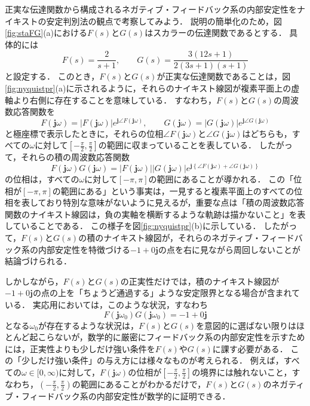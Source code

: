 \documentclass[a4j,10pt,oneside,openany,dvipdfmx]{jsbook}
\begin{document}
\begin{example}[ナイキストの安定判別法に基づく正実な伝達関数のフィードバック系の安定性解析]
\label{ex:nyquistpr}
正実な伝達関数から構成されるネガティブ・フィードバック系の内部安定性をナイキストの安定判別法の観点で考察してみよう．
説明の簡単化のため，図\ref{fig:staFG}(a)における$F(s)$と$G(s)$はスカラーの伝達関数であるとする．
具体的には
\[
F(s)=\frac{2}{s+1}
,\qquad
G(s)=\frac{3(12s+1)}{2(3s+1)(s+1)}
\]
と設定する．
このとき，$F(s)$と$G(s)$が正実な伝達関数であることは，図\ref{fig:nyquistpr}(a)に示されるように，それらのナイキスト線図が複素平面上の虚軸より右側に存在することを意味している．
すなわち，$F(s)$と$G(s)$の周波数応答関数を
\[
F(\bm{j} \omega) = |F(\bm{j} \omega)| e^{\bm{j} \angle F(\bm{j} \omega)}
,\qquad
G(\bm{j} \omega) = |G(\bm{j} \omega)| e^{\bm{j} \angle G(\bm{j} \omega)}
\]
と極座標で表示したときに，それらの位相$\angle F(\bm{j} \omega)$と$\angle G(\bm{j} \omega)$はどちらも，すべての$\omega$に対して$[-\frac{\pi}{2},\frac{\pi}{2}]$の範囲に収まっていることを表している．
したがって，それらの積の周波数応答関数
\[
F(\bm{j} \omega) G(\bm{j} \omega)
=
|F(\bm{j} \omega)| |G(\bm{j} \omega)| e^{\bm{j} \left\{\angle F(\bm{j} \omega) + \angle G(\bm{j} \omega)\right\}}
\]
の位相は，すべての$\omega$に対して$[-\pi,\pi]$の範囲にあることが導かれる．
この「位相が$[-\pi,\pi]$の範囲にある」という事実は，一見すると複素平面上のすべての位相を表しており特別な意味がないように見えるが，重要な点は「積の周波数応答関数のナイキスト線図は，負の実軸を横断するような軌跡は描かないこと」を表していることである．
この様子を図\ref{fig:nyquistpr}(b)に示している．
したがって，$F(s)$と$G(s)$の積のナイキスト線図が，それらのネガティブ・フィードバック系の内部安定性を特徴づける$-1 + 0 \bm{j}$の点を右に見ながら周回しないことが結論づけられる．

しかしながら，$F(s)$と$G(s)$の正実性だけでは，積のナイキスト線図が$-1 + 0 \bm{j}$の点の上を「ちょうど通過する」ような安定限界となる場合が含まれている．
実応用においては，このような状況，すなわち
\[
F(\bm{j} \omega_0) G(\bm{j} \omega_0) = -1 + 0 \bm{j}
\]
となる$\omega_0$が存在するような状況は，$F(s)$と$G(s)$を意図的に選ばない限りはほとんど起こらないが，数学的に厳密にフィードバック系の内部安定性を示すためには，正実性よりも少しだけ強い条件を$F(s)$や$G(s)$に課す必要がある．
この「少しだけ強い条件」の与え方には様々なものが考えられる．
例えば，すべての$\omega \in [0,\infty)$に対して，$F(\bm{j} \omega)$の位相が$[-\frac{\pi}{2},\frac{\pi}{2}]$の境界には触れないこと，すなわち，$(-\frac{\pi}{2},\frac{\pi}{2})$の範囲にあることがわかるだけで，$F(s)$と$G(s)$のネガティブ・フィードバック系の内部安定性が数学的に証明できる．
\end{example}
\end{document}
